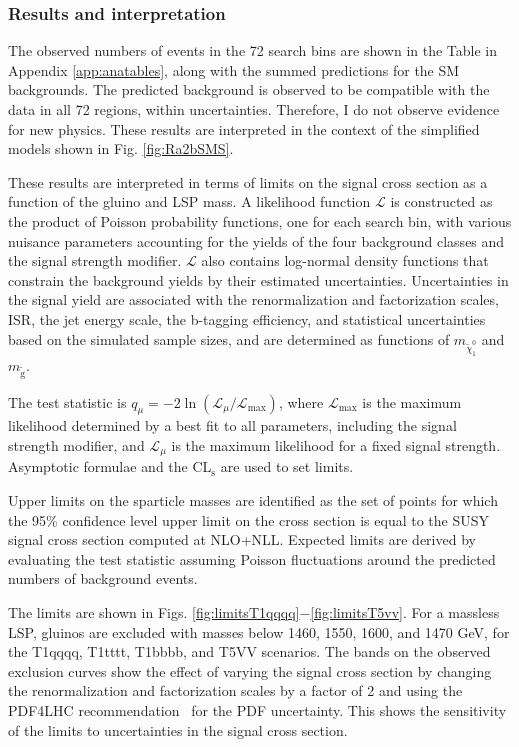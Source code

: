 \subsubsection{Results and interpretation}
The observed numbers of events in the 72 search bins
are shown in the Table in Appendix \ref{app:anatables}, along with the summed predictions for the SM backgrounds. The predicted background is observed to be compatible
with the data in all 72 regions, within uncertainties. Therefore, I do not observe evidence for new physics.
These results are interpreted in the context of the simplified models shown in Fig. \ref{fig:Ra2bSMS}.

These results are interpreted in terms of limits on the signal cross section
as a function of the gluino and LSP mass.
A likelihood function $\mathcal{L}$ is constructed as the product of Poisson probability functions,
one for each search bin, with various nuisance parameters accounting
for the yields of the four background classes and the signal strength modifier.
$\mathcal{L}$ also contains log-normal density functions that constrain the background 
yields by their estimated uncertainties. Uncertainties in the signal yield are associated
with the renormalization and factorization scales, ISR, the jet energy scale, the b-tagging efficiency,
and statistical uncertainties based on the simulated sample sizes, and are determined
as functions of $m_{\tilde{\chi}^{0}_{1}}$ and $m_{\tilde{\text{g}}}$.

The test statistic is
$q_\mu =  - 2 \ln \left( \mathcal{L}_\mu/\mathcal{L}_\text{max} \right)$,
where $\mathcal{L}_\text{max}$ is the maximum likelihood
determined by a best fit to all parameters, including the signal strength modifier,
and $\mathcal{L}_\mu$ is the maximum likelihood for a fixed signal strength.
Asymptotic formulae \cite{Cowan:2010js}
and the CL$_\mathrm{s}$ \cite{Junk1999,bib-cls} are used to set limits. 

Upper limits on the sparticle masses are identified as the set of points 
for which the 95\% confidence level upper limit on the cross section is equal to
the SUSY signal cross section computed at NLO+NLL. Expected limits are 
derived by evaluating the test statistic assuming Poisson fluctuations around
the predicted numbers of background events.

The limits are shown in Figs. \ref{fig:limitsT1qqqq}$-$\ref{fig:limitsT5vv}. For a massless LSP, gluinos are excluded with masses below 1460, 1550, 1600, and 1470 GeV,
for the T1qqqq, T1tttt, T1bbbb, and T5VV scenarios. The bands on the observed exclusion curves show the effect of varying the signal cross section by changing the renormalization and factorization scales by a factor of 2 and using the PDF4LHC recommendation~\cite{Botje:2011sn} for the PDF uncertainty. This shows the sensitivity of the limits to uncertainties in the signal cross section. 

